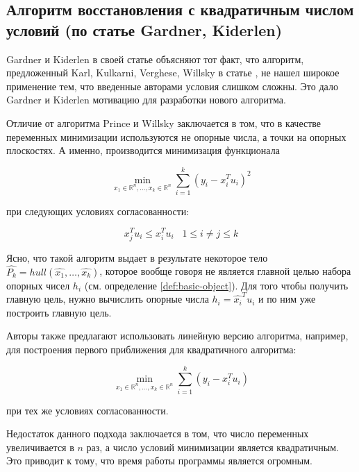 \documentclass[a4paper, 12pt, titlepage]{article}
\theoremstyle{definition}
\theoremstyle{plain}
\theoremstyle{plain}
\begin{document}
\newpage
\subsection{Алгоритм восстановления с квадратичным числом условий (по статье
Gardner, Kiderlen)}

Gardner и Kiderlen в своей статье \cite{journals/pami/GardnerK09} объясняют
тот факт, что алгоритм, предложенный Karl, Kulkarni, Verghese, Willsky в статье 
\cite{journals/jmiv/KarlKVW96}, не нашел широкое применение тем, что
введенные авторами условия слишком сложны. Это дало Gardner и Kiderlen 
мотивацию для разработки нового алгоритма.

Отличие от алгоритма Prince и Willsky заключается в том, что в качестве 
переменных минимизации используются не опорные числа, а точки на опорных 
плоскостях. А именно, производится минимизация функционала

\begin{equation}
 \min_{x_{1} \in \mathbb{R}^{n}, \ldots, x_{k} \in \mathbb{R}^{n}}
 \sum \limits_{i = 1}^{k} (y_{i} - x_{i}^{T} u_{i})^{2}
\end{equation}

при следующих условиях согласованности:

\begin{equation}
 x_{j}^{T} u_{i} \leq x_{i}^{T} u_{i} \;\;\; 1 \leq i \neq j \leq k
\end{equation}

Ясно, что такой алгоритм выдает в результате некоторое тело
$\widehat{P_{k}} = hull(\widehat{x_{1}}, \ldots, \widehat{x_{k}})$, которое
вообще говоря не является главной целью набора опорных чисел $h_{i}$ (см. 
определение \ref{def:basic-object}). Для того чтобы получить главную цель, 
нужно вычислить опорные числа $h_{i} = \widehat{x_{i}}^{T} u_{i}$ и по ним уже 
построить главную цель.

Авторы также предлагают использовать линейную версию алгоритма, например, для
построения первого приближения для квадратичного алгоритма:

\begin{equation}
 \min_{x_{1} \in \mathbb{R}^{n}, \ldots, x_{k} \in \mathbb{R}^{n}}
 \sum \limits_{i = 1}^{k} (y_{i} - x_{i}^{T} u_{i})
\end{equation}

при тех же условиях согласованности.

Недостаток данного подхода заключается в том, что число переменных
увеличивается в $n$ раз, а число условий минимизации является квадратичным. Это
приводит к тому, что время работы программы является огромным.
\end{document}
